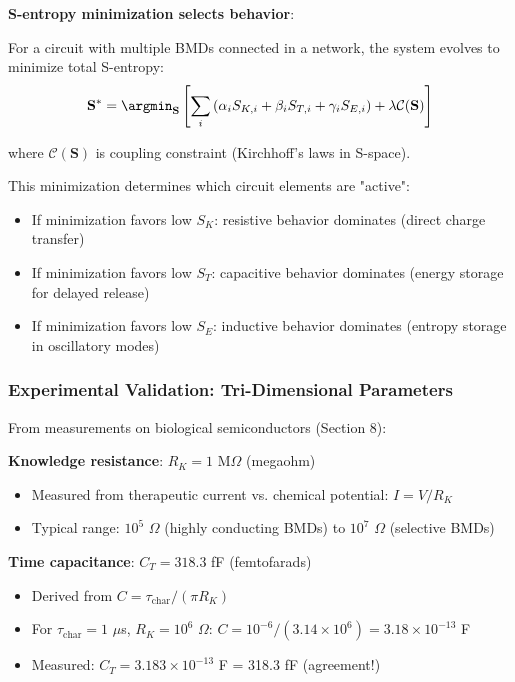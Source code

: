 \documentclass[11pt,a4paper]{article}
\begin{document}
\textbf{S-entropy minimization selects behavior}:

For a circuit with multiple BMDs connected in a network, the system evolves to minimize total S-entropy:
\begin{equation}
\mathbf{S}^* = \argmin_{\mathbf{S}} \left[\sum_i \left(\alpha_i S_{K,i} + \beta_i S_{T,i} + \gamma_i S_{E,i}\right) + \lambda \mathcal{C}(\mathbf{S})\right]
\end{equation}

where $\mathcal{C}(\mathbf{S})$ is coupling constraint (Kirchhoff's laws in S-space).

This minimization determines which circuit elements are "active":
\begin{itemize}
\item If minimization favors low $S_K$: resistive behavior dominates (direct charge transfer)
\item If minimization favors low $S_T$: capacitive behavior dominates (energy storage for delayed release)
\item If minimization favors low $S_E$: inductive behavior dominates (entropy storage in oscillatory modes)
\end{itemize}

\subsubsection{Experimental Validation: Tri-Dimensional Parameters}

From measurements on biological semiconductors (Section 8):

\textbf{Knowledge resistance}: $R_K = 1$ M$\Omega$ (megaohm)
\begin{itemize}
\item Measured from therapeutic current vs. chemical potential: $I = V/R_K$
\item Typical range: $10^5$ $\Omega$ (highly conducting BMDs) to $10^7$ $\Omega$ (selective BMDs)
\end{itemize}

\textbf{Time capacitance}: $C_T = 318.3$ fF (femtofarads)
\begin{itemize}
\item Derived from $C = \tau_{\text{char}} / (\pi R_K)$
\item For $\tau_{\text{char}} = 1$ $\mu$s, $R_K = 10^6$ $\Omega$: $C = 10^{-6} / (3.14 \times 10^6) = 3.18 \times 10^{-13}$ F
\item Measured: $C_T = 3.183 \times 10^{-13}$ F = 318.3 fF (agreement!)
\end{itemize}
\end{document}
